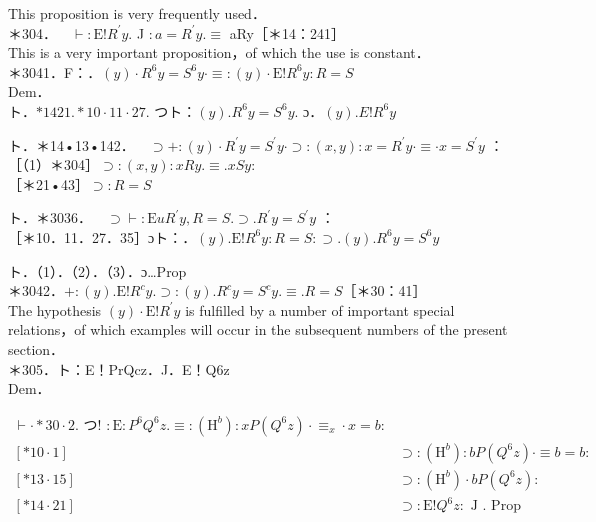 \documentclass[10pt]{article}
\begin{document}
This proposition is very frequently used．\\
＊304．$\quad \vdash: \mathrm{E}!R^{\prime} y$. J $: a=R^{\prime} y . \equiv$ aRy［＊14：241］\\
This is a very important proposition，of which the use is constant．\\
＊3041．F：．$(y) \cdot R^{6} y=S^{6} y \cdot \equiv:(y) \cdot \mathrm{E}!R^{6} y: R=S$\\
Dem．\\
ト．$* 1421 . * 10 \cdot 11 \cdot 27$. つト：$(y) . R^{6} y=S^{6} y$. ɔ．$(y) . E!R^{6} y$

ト．＊14•13•142．$\quad \supset+:(y) \cdot R^{\prime} y=S^{\prime} y \cdot \supset:(x, y): x=R^{\prime} y \cdot \equiv \cdot x=S^{\prime} y$ ：\\
［（1）＊304］$\supset:(x, y): x R y . \equiv . x S y:$\\
［＊21•43］$\supset: R=S$

ト．＊3036．$\quad \supset \vdash: \mathrm{E} u R^{\prime} y, R=S . \supset . R^{\prime} y=S^{\prime} y$ ：\\
［＊10．11．27．35］ɔト：．$(y) . \mathrm{E}!R^{6} y: R=S: \supset .(y) . R^{6} y=S^{6} y$

ト．（1）．（2）．（3）．ɔ…Prop\\
＊3042．$+:(y) . \mathrm{E}!R^{c} y . \supset:(y) . R^{c} y=S^{c} y . \equiv . R=S$［＊30：41］\\
The hypothesis $(y) \cdot \mathrm{E}!R^{\prime} y$ is fulfilled by a number of important special relations，of which examples will occur in the subsequent numbers of the present section．\\
＊305．ト：E！PrQcz．J．E！Q6z\\
Dem．

$$
\begin{array}{ll}
\vdash \cdot * 30 \cdot 2 . \text { つ! }: \mathrm{E}: P^{6} Q^{6} z . \equiv:\left(\mathrm{H}^{b}\right): x P\left(Q^{6} z\right) \cdot \equiv_{x} \cdot x=b: \\
{[* 10 \cdot 1]} & \supset:\left(\mathrm{H}^{b}\right): b P\left(Q^{6} z\right) \cdot \equiv b=b: \\
{[* 13 \cdot 15]} & \supset:\left(\mathrm{H}^{b}\right) \cdot b P\left(Q^{6} z\right): \\
{[* 14 \cdot 21]} & \supset: \mathrm{E}!Q^{6} z: \text { J } . \text { Prop }
\end{array}
$$
\end{document}

